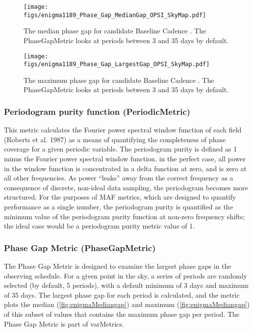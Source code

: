 \begin{figure}[tbh!]
\texttt{[image: figs/enigma1189\_Phase\_Gap\_MedianGap\_OPSI\_SkyMap.pdf]}
\caption{The median phase gap for candidate Baseline Cadence .
The PhaseGapMetric looks at periods between 3 and 35 days by default.}
\label{fig:enigmaMedianGap}
\end{figure}

\begin{figure}[tbh!]
\texttt{[image: figs/enigma1189\_Phase\_Gap\_LargestGap\_OPSI\_SkyMap.pdf]}
\caption{The maximum phase gap for candidate Baseline Cadence .
The PhaseGapMetric looks at periods between 3 and 35 days by default.}
\label{fig:enigmaMaxGap}
\end{figure}

\subsubsection{Periodogram purity function (PeriodicMetric)}
This metric calculates the Fourier power spectral window function of each field (Roberts et al. 1987) as a means of quantifying the completeness of phase coverage for a given periodic variable. The periodogram purity is defined as 1 minus the Fourier power spectral window function. in the perfect case, all power in the window function is concentrated in a delta function at zero, and is zero at all other frequencies. As power ``leaks'' away from the correct frequency as a consequence of discrete, non-ideal data sampling, the periodogram becomes more structured. For the purposes of MAF metrics, which are designed to quantify performance as a single number, the periodogram purity is quantified as the minimum value of the periodogram purity function at non-zero frequency shifts; the ideal case would be a periodogram purity metric value of 1.

\subsubsection{Phase Gap Metric (PhaseGapMetric)}

The Phase Gap Metric is designed to examine the largest phase gaps in the observing schedule. For a given point in the sky, a series of periods are randomly selected (by default, 5 periods), with a default minimum of 3 days and maximum of 35 days. The largest phase gap for each period is calculated, and the metric plots the median (\autoref{fig:enigmaMediangap}) and maximum (\autoref{fig:enigmaMediangap}) of this subset of values that contains the maximum phase gap per period. The Phase Gap Metric is part of varMetrics.

